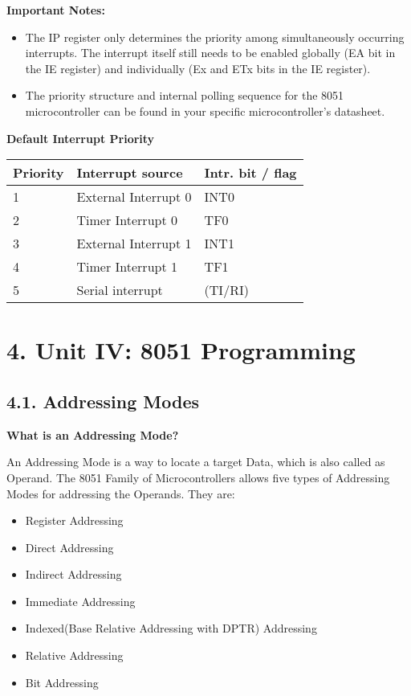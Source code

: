 \documentclass[
]{article}
\begin{document}
\textbf{Important Notes:}

\begin{itemize}
\item
  The IP register only determines the priority among simultaneously
  occurring interrupts. The interrupt itself still needs to be enabled
  globally (EA bit in the IE register) and individually (Ex and ETx bits
  in the IE register).
\item
  The priority structure and internal polling sequence for the 8051
  microcontroller can be found in your specific microcontroller's
  datasheet.
\end{itemize}

\textbf{Default Interrupt Priority}

\begin{longtable}[]{@{}lll@{}}
\toprule
\textbf{Priority} & \textbf{Interrupt source} & \textbf{Intr. bit /
flag} \\
\midrule
\endhead
1 & External Interrupt 0 & INT0 \\
2 & Timer Interrupt 0 & TF0 \\
3 & External Interrupt 1 & INT1 \\
4 & Timer Interrupt 1 & TF1 \\
5 & Serial interrupt & (TI/RI) \\
\bottomrule
\end{longtable}

\hypertarget{4-unit-iv-8051-programming}{%
\section{4. Unit IV: 8051
Programming}\label{4-unit-iv-8051-programming}}

\hypertarget{41-addressing-modes}{%
\subsection{4.1. Addressing Modes}\label{41-addressing-modes}}

\textbf{What is an Addressing Mode?}

An Addressing Mode is a way to locate a target Data, which is also
called as Operand. The 8051 Family of Microcontrollers allows five types
of Addressing Modes for addressing the Operands. They are:

\begin{itemize}
\item
  Register Addressing
\item
  Direct Addressing
\item
  Indirect Addressing
\item
  Immediate Addressing
\item
  Indexed(Base Relative Addressing with DPTR) Addressing
\item
  Relative Addressing
\item
  Bit Addressing
\end{itemize}
\end{document}
